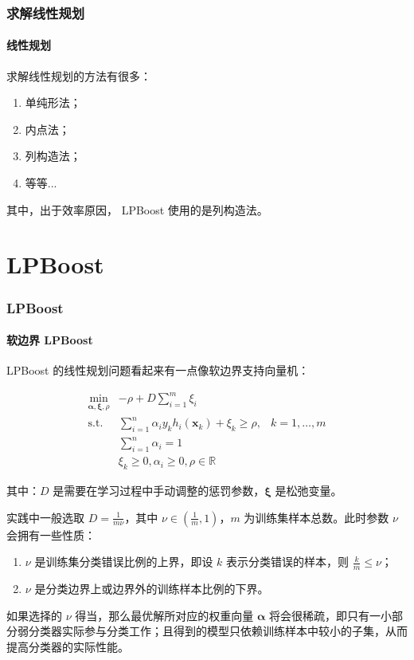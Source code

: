 \documentclass{ctexbeamer}
\begin{document}
    \begin{frame}
        \frametitle{求解线性规划}
        \framesubtitle{线性规划}
    
        求解线性规划的方法有很多：

        \begin{enumerate}
            \item 单纯形法；\pause
            \item 内点法；\pause
            \item 列构造法；\pause
            \item 等等... \pause
        \end{enumerate}

        其中，出于效率原因， LPBoost 使用的是列构造法。\pause
    
    \end{frame}

    \section{LPBoost}

    \begin{frame}
        \frametitle{LPBoost}
        \framesubtitle{软边界 LPBoost}
    
        LPBoost 的线性规划问题看起来有一点像软边界支持向量机：

        \begin{align*}
            \min_{\pmb{\alpha,\xi},\rho} & -\!\!\rho + D \sum_{i=1}^m \xi_i & \\
            \mathrm{s.t.} & \sum_{i=1}^n \alpha_i y_k h_i(\pmb{x}_k) + \xi_k \geq \rho, & k = 1,\ldots,m \\
             & \sum_{i=1}^n \alpha_i = 1 & \\
             & \xi_k \geq 0, \alpha_i \geq 0, \rho \in \mathbb{R} &
        \end{align*} \pause

        其中：$D$ 是需要在学习过程中手动调整的惩罚参数，$\pmb{\xi}$ 是松弛变量。
    
    \end{frame}

    \begin{frame}
    
        实践中一般选取 $D = \frac{1}{m\nu}$，其中 $\nu \in (\frac{1}{m}, 1)$，$m$ 为训练集样本总数。此时参数 $\nu$ 会拥有一些性质：\pause

        \begin{enumerate}
            \item $\nu$ 是训练集分类错误比例的上界，即设 $k$ 表示分类错误的样本，则 $\frac{k}{m} \leq \nu$；\pause
            \item $\nu$ 是分类边界上或边界外的训练样本比例的下界。
        \end{enumerate} \pause

        如果选择的 $\nu$ 得当，那么最优解所对应的权重向量 $\pmb{\alpha}$ 将会很稀疏，即只有一小部分弱分类器实际参与分类工作；且得到的模型只依赖训练样本中较小的子集，从而提高分类器的实际性能。
    
    \end{frame}
\end{document}
